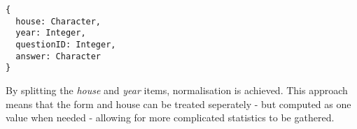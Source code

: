 \begin{Verbatim}[fontsize=\small]
{
  house: Character,
  year: Integer,
  questionID: Integer,
  answer: Character
}
\end{Verbatim}

By splitting the \textit{house} and \textit{year} items, normalisation is achieved. This approach means that the form and house can be treated seperately - but computed as one value when needed - allowing for more complicated statistics to be gathered.
